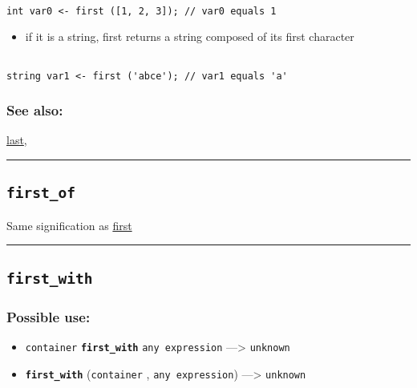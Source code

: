 \documentclass[]{book}
\providecommand{\tightlist}{%
  \setlength{\itemsep}{0pt}\setlength{\parskip}{0pt}}
\theoremstyle{definition}
\theoremstyle{definition}
\theoremstyle{definition}
\theoremstyle{remark}
\begin{document}
\begin{verbatim}
 
int var0 <- first ([1, 2, 3]); // var0 equals 1
\end{verbatim}

\begin{itemize}
\tightlist
\item
  if it is a string, first returns a string composed of its first
  character
\end{itemize}

\begin{verbatim}
 
string var1 <- first ('abce'); // var1 equals 'a'
\end{verbatim}

\subsubsection{See also:}\label{see-also-94}

\href{OperatorsIM\#last}{last},

\begin{center}\rule{0.5\linewidth}{\linethickness}\end{center}

\subsection{\texorpdfstring{\texttt{first\_of}}{first\_of}}\label{first_of}

Same signification as \href{OperatorsDH\#first}{first}

\begin{center}\rule{0.5\linewidth}{\linethickness}\end{center}

\subsection{\texorpdfstring{\texttt{first\_with}}{first\_with}}\label{first_with}

\subsubsection{Possible use:}\label{possible-use-168}

\begin{itemize}
\tightlist
\item
  \texttt{container} \textbf{\texttt{first\_with}}
  \texttt{any\ expression} ---\textgreater{} \texttt{unknown}
\item
  \textbf{\texttt{first\_with}} (\texttt{container} ,
  \texttt{any\ expression}) ---\textgreater{} \texttt{unknown}
\end{itemize}
\end{document}
